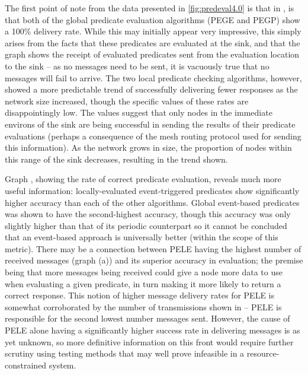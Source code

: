 The first point of note from the data presented in \autoref{fig:predeval4.0} is that in , is that both of the global predicate evaluation algorithms (PEGE and PEGP) show a 100\% delivery rate. While this may initially appear very impressive, this simply arises from the facts that these predicates are evaluated at the sink, and that the graph shows the receipt of evaluated predicates sent from the evaluation location to the sink -- as no messages need to be sent, it is vacuously true that no messages will fail to arrive. The two local predicate checking algorithms, however, showed a more predictable trend of successfully delivering fewer responses as the network size increased, though the specific values of these rates are disappointingly low. The values suggest that only nodes in the immediate environs of the sink are being successful in sending the results of their predicate evaluations (perhaps a consequence of the mesh routing protocol used for sending this information). As the network grows in size, the proportion of nodes within this range of the sink decreases, resulting in the trend shown.

Graph , showing the rate of correct predicate evaluation, reveals much more useful information: locally-evaluated event-triggered predicates show significantly higher accuracy than each of the other algorithms. Global event-based predicates was shown to have the second-highest accuracy, though this accuracy was only slightly higher than that of its periodic counterpart so it cannot be concluded that an event-based approach is universally better (within the scope of this metric). There may be a connection between PELE having the highest number of received messages (graph (a)) and its superior accuracy in evaluation; the premise being that more messages being received could give a node more data to use when evaluating a given predicate, in turn making it more likely to return a correct response. This notion of higher message delivery rates for PELE is somewhat corroborated by the number of transmissions shown in  -- PELE is responsible for the second lowest number messages sent. However, the cause of PELE alone having a significantly higher success rate in delivering messages is as yet unknown, so more definitive information on this front would require further scrutiny using testing methods that may well prove infeasible in a resource-constrained system.

